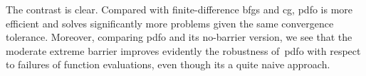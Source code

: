 \documentclass[
    smallextended,  %
    final,          %
]{svjour3}
\begin{document}
The contrast is clear. Compared with finite-difference \gls{bfgs} and \gls{cg}, \gls{pdfo} is
more efficient and solves significantly more problems given the same convergence tolerance.
Moreover, comparing \gls{pdfo} and its no-barrier version, we see that the moderate extreme barrier
improves evidently the robustness of~\gls{pdfo} with respect to failures of function evaluations,
even though its a quite naive approach.






\end{document}
